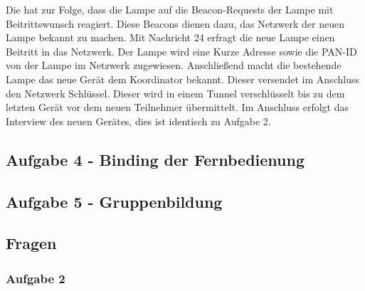 Die hat zur Folge, dass die Lampe auf die Beacon-Requests der Lampe mit Beitrittswunsch reagiert. Diese Beacons dienen dazu, das Netzwerk der neuen Lampe bekannt zu machen.
Mit Nachricht 24 erfragt die neue Lampe einen Beitritt in das Netzwerk. Der Lampe wird eine Kurze Adresse sowie die PAN-ID von der Lampe im Netzwerk zugewiesen. Anschließend 
macht die bestehende Lampe das neue Gerät dem Koordinator bekannt. Dieser versendet im Anschluss den Netzwerk Schlüssel. Dieser wird in einem Tunnel verschlüsselt bis zu dem letzten
Gerät vor dem neuen Teilnehmer übermittelt. Im Anschluss erfolgt das Interview des neuen Gerätes, dies ist identisch zu Aufgabe 2.

\subsection{Aufgabe 4 - Binding der Fernbedienung}
\subsection{Aufgabe 5 - Gruppenbildung}
\subsection{Fragen}
\subsubsection{Aufgabe 2}




